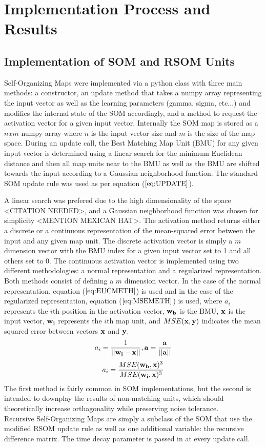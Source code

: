 \documentclass[a4paper,10pt]{article}
\begin{document}
\section{Implementation Process and Results}
\subsection{Implementation of SOM and RSOM Units}
Self-Organizing Maps were implemented via a python class with three main methods: a constructor,
an update method that takes a numpy array representing the input vector as well as the learning
parameters (gamma, sigma, etc...) and modifies the internal state of the SOM accordingly, and a
method to request the activation vector for a given input vector. Internally the SOM map is stored
as a $nxm$ numpy array where $n$ is the input vector size and $m$ is the size of the map space. 
During an update call, the Best Matching Map Unit (BMU) for any given input vector is determined
using a linear search for the minimum Euclidean distance and then all map units near to the BMU as
well as the BMU are shifted towards the input according to a Gaussian neighborhood function.  The
standard SOM update rule was used as per equation ($\ref{eq:UPDATE}$).
 
A linear search was prefered due to the high dimensionality of the space <CITATION NEEDED>, and a
Gaussian neighborhood function was chosen for simplicity <MENTION MEXICAN HAT>.  The activation
method returns either a discrete or a continuous representation of the mean-squared error between
the input and any given map unit. The discrete activation vector is simply a $m$ dimension vector
with the BMU index for a given input vector set to 1 and all others set to 0. The continuous
activation vector is implemented using two different methodologies: a normal representation and a
regularized representation. Both methods consist of defining a $m$ dimension vector.  In the case
of the normal representation, equation ($\ref{eq:EUCMETH}$) is used and in the case of the
regularized representation, equation ($\ref{eq:MSEMETH}$) is used, where $a_i$ represents the
$i$th position in the activation vector, $\bold{w_b}$ is the BMU, $\bold{x}$ is the input vector,
$\bold{w_i}$ represents the $i$th map unit, and $MSE(\bold{x},\bold{y})$ indicates the mean squared
error between vectors $\bold{x}$ and $\bold{y}$.
\begin{equation} \label{eq:EUCMETH}
 a_i = \frac{1}{||\bold{w_i}-\bold{x}||}, \bold{a} = \frac{\bold{a}}{||\bold{a}||}
\end{equation}
\begin{equation} \label{eq:MSEMETH}
 a_i = \frac{MSE(\bold{w_b}, \bold{x})^3}{MSE(\bold{w_i},\bold{x})^3}
\end{equation}
The first method is fairly common in SOM implementations, but the second is intended to downplay the
results of non-matching units, which should theoretically increase orthagonality while preserving
noise tolerance.
\\
Recursive Self-Organizing Maps are simply a subclass of the SOM that use the modified RSOM update
rule as well as one additional variable: the recursive difference matrix.  The time decay parameter
is passed in at every update call.
\end{document}
